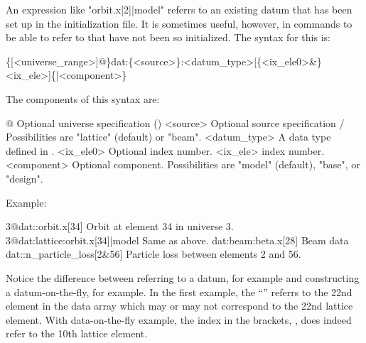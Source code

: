 An expression like "orbit.x[2]|model" referrs to an existing datum
that has been set up in the \tao initialization file.  It is sometimes
useful, however, in \tao commands to be able to refer to 
that have not been so initialized. The syntax for this is:
\begin{example}
  \{[<universe_range>]@\}dat:\{<source>\}:<datum_type>[\{<ix_ele0>&\}<ix_ele>]\{|<component>\}
\end{example}
The components of this syntax are:
\begin{example}
  @    Optional universe specification ()
  <source>               Optional source specification /
                            Possibilities are "lattice" (default) or "beam".
  <datum_type>           A data type defined in .
  <ix_ele0>              Optional  index number.
  <ix_ele>                index number.
  <component>            Optional component. 
                            Possibilities are "model" (default), "base", or "design".
\end{example}
Example:
\begin{example}
  3@dat::orbit.x[34]                 Orbit at element 34 in universe 3.
  3@dat:lattice:orbit.x[34]|model    Same as above.
  dat:beam:beta.x[28]                Beam data
  dat::n_particle_loss[2&56]         Particle loss between elements 2 and 56.
\end{example}
Notice the difference between referring to a datum, for example
 and constructing a datum-on-the-fly, for
example. In the first example, the ``\vn{[22]}''
referrs to the 22nd element in the data array which may or may not
correspond to the 22nd lattice element. With data-on-the-fly example,
the index in the brackets, \vn{[10]}, does indeed refer to the 10th
lattice element.
